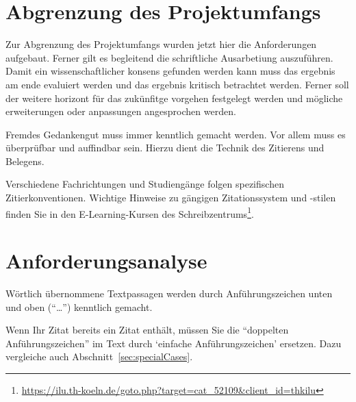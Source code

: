 \section{Abgrenzung des Projektumfangs}
Zur Abgrenzung des Projektumfangs wurden jetzt hier die Anforderungen aufgebaut.
Ferner gilt es begleitend die schriftliche Ausarbetiung auszuführen.
Damit ein wissenschaftlicher konsens gefunden werden kann muss das ergebnis am ende evaluiert werden und das ergebnis kritisch betrachtet werden.
Ferner soll der weitere horizont für das zukünfitge vorgehen festgelegt werden und mögliche erweiterungen oder anpassungen angesprochen werden.


\label{chap:literature}
%
Fremdes Gedankengut muss immer kenntlich gemacht werden. Vor allem muss es überprüfbar und auffindbar sein. Hierzu dient die Technik des Zitierens und Belegens.
\par
Verschiedene Fachrichtungen und Studiengänge folgen spezifischen Zitierkonventionen. Wichtige Hinweise zu gängigen Zitationssystem und -stilen finden Sie in den E-Learning-Kursen des Schreibzentrums\footnote{\href{https://ilu.th-koeln.de/goto.php?target=cat\_52109\&client\_id=thkilu}{https://ilu.th-koeln.de/goto.php?target=cat\_52109\&client\_id=thkilu}}.
%
\section{Anforderungsanalyse}
\par
Wörtlich übernommene Textpassagen werden durch Anführungszeichen unten und oben (\enquote{\ldots}) kenntlich gemacht.
\par
Wenn Ihr Zitat bereits ein Zitat enthält, müssen Sie die \enquote{doppelten Anführungszeichen} im Text durch \enquote*{einfache Anführungszeichen} ersetzen. Dazu vergleiche auch Abschnitt~\ref{sec:specialCases}.
%
